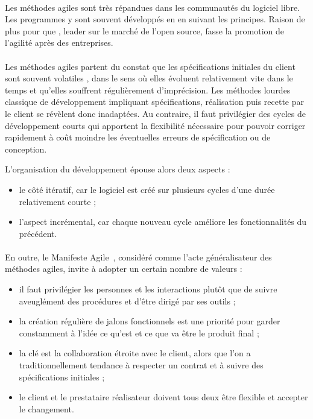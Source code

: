 \paragraph{}
Les méthodes agiles sont très répandues dans les communautés du logiciel libre.
Les programmes y sont souvent développés en en suivant les principes.
Raison de plus pour que \asmile{}, leader sur le marché de l'open source, fasse la promotion de l'agilité après des entreprises.

\paragraph{}
Les méthodes agiles partent du constat que les spécifications initiales du client sont souvent \og volatiles \fg, dans le sens où elles évoluent relativement vite dans le temps et qu'elles souffrent régulièrement d'imprécision.
Les méthodes lourdes classique de développement impliquant spécifications, réalisation puis recette par le client se révèlent donc inadaptées.
Au contraire, il faut privilégier des cycles de développement courts qui apportent la flexibilité nécessaire pour pouvoir corriger rapidement à coût moindre les éventuelles erreurs de spécification ou de conception.

L'organisation du développement épouse alors deux aspects :

\begin{itemize}
	\item le côté itératif, car le logiciel est créé sur plusieurs cycles d'une durée relativement courte ;
	\item l'aspect incrémental, car chaque nouveau cycle améliore les fonctionnalités du précédent.
\end{itemize}

\paragraph{}
En outre, le Manifeste Agile~\cite{agile}, considéré comme l'acte généralisateur des méthodes agiles, invite à adopter un certain nombre de valeurs :

\begin{itemize}
	\item il faut privilégier les personnes et les interactions plutôt que de suivre aveuglément des procédures et d'être dirigé par ses outils ;
	\item la création régulière de jalons fonctionnels est une priorité pour garder constamment à l'idée ce qu'est et ce que va être le produit final ;
	\item la clé est la collaboration étroite avec le client, alors que l'on a traditionnellement tendance à respecter un contrat et à suivre des spécifications initiales ;
	\item le client et le prestataire réalisateur doivent tous deux être flexible et accepter le changement.
\end{itemize}


